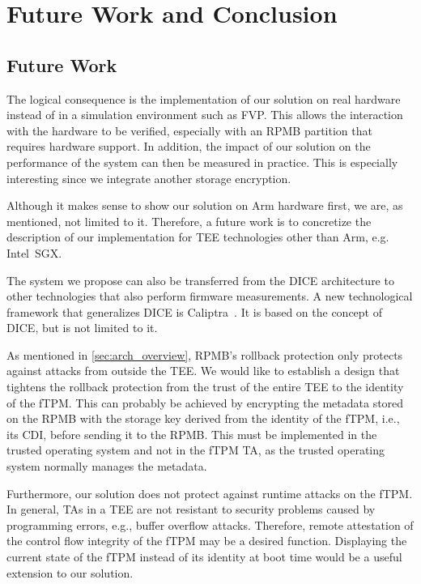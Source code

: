 
\chapter{Future Work and Conclusion}\label{chapter:future_work_and_conclusion}

\section{Future Work}

The logical consequence is the implementation of our solution on real hardware instead of in a simulation environment such as FVP\@.
This allows the interaction with the hardware to be verified, especially with an RPMB partition that requires hardware support.
In addition, the impact of our solution on the performance of the system can then be measured in practice.
This is especially interesting since we integrate another storage encryption.

Although it makes sense to show our solution on Arm hardware first, we are, as mentioned, not limited to it.
Therefore, a future work is to concretize the description of our implementation for TEE technologies other than Arm, e.g. Intel~SGX\@.

The system we propose can also be transferred from the DICE architecture to other technologies that also perform firmware measurements.
A new technological framework that generalizes DICE is Caliptra~\cite{caliptra}.
It is based on the concept of DICE, but is not limited to it.

As mentioned in \autoref{sec:arch_overview}, RPMB's rollback protection only protects against attacks from outside the TEE\@.
We would like to establish a design that tightens the rollback protection from the trust of the entire TEE to the identity of the fTPM\@.
This can probably be achieved by encrypting the metadata stored on the RPMB with the storage key derived from the identity of the fTPM, i.e., its CDI, before sending it to the RPMB\@.
This must be implemented in the trusted operating system and not in the fTPM TA, as the trusted operating system normally manages the metadata.

Furthermore, our solution does not protect against runtime attacks on the fTPM\@.
In general, \acp{TA} in a TEE are not resistant to security problems caused by programming errors, e.g., buffer overflow attacks.
Therefore, remote attestation of the control flow integrity of the fTPM may be a desired function.
Displaying the current state of the fTPM instead of its identity at boot time would be a useful extension to our solution.

